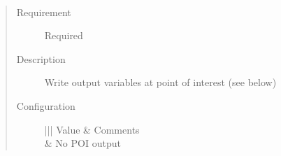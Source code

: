 \documentclass[letterpaper,10pt,english]{sphinxmanual}
\begin{document}
\begin{fulllineitems}
\label{\detokenize{input_files/SOLWEIG_input/SOLWEIGinput:cmdoption-arg-solweigpoi-out}}~\begin{quote}\begin{description}
\item[{Requirement}] \leavevmode
Required

\item[{Description}] \leavevmode
Write output variables at point of interest (see below)

\item[{Configuration}] \leavevmode

\begin{savenotes}\sphinxattablestart
\centering
\begin{tabular}[t]{|||}
\hline
\sphinxstyletheadfamily 
Value
&\sphinxstyletheadfamily 
Comments
\\
&
No POI output
\\
\hline
\end{tabular}
\par
\sphinxattableend\end{savenotes}

\end{description}\end{quote}

\end{fulllineitems}

\end{document}
